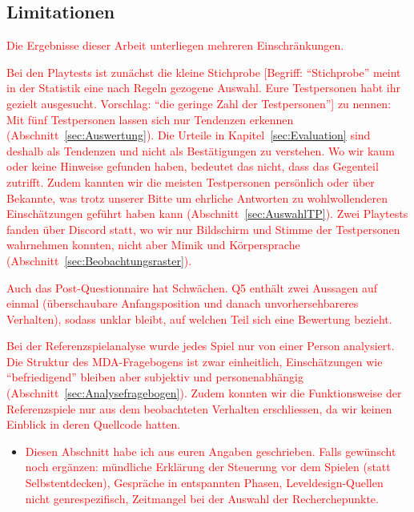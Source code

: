 \documentclass[../Main.tex]{subfiles}
\begin{document}
\subsection{Limitationen} \label{sec:Limitationen}

\textcolor{red}{Die Ergebnisse dieser Arbeit unterliegen mehreren Einschränkungen.}

\textcolor{red}{Bei den Playtests ist zunächst die \textcolor{red}{kleine Stichprobe [Begriff: \enquote{Stichprobe} meint in der Statistik eine nach Regeln gezogene Auswahl. Eure Testpersonen habt ihr gezielt ausgesucht. Vorschlag: \enquote{die geringe Zahl der Testpersonen}]} zu nennen: Mit fünf Testpersonen lassen sich nur Tendenzen erkennen (Abschnitt~\ref{sec:Auswertung}). Die Urteile in Kapitel~\ref{sec:Evaluation} \textcolor{red}{sind deshalb als Tendenzen und nicht als Bestätigungen zu verstehen. Wo wir kaum oder keine Hinweise gefunden haben,} bedeutet das nicht, dass das Gegenteil zutrifft. Zudem kannten wir die meisten Testpersonen persönlich oder über Bekannte, was trotz unserer Bitte um ehrliche Antworten zu wohlwollenderen Einschätzungen geführt haben kann (Abschnitt~\ref{sec:AuswahlTP}). Zwei Playtests fanden über Discord statt, wo wir nur Bildschirm und Stimme der Testpersonen wahrnehmen konnten, nicht aber Mimik und Körpersprache (Abschnitt~\ref{sec:Beobachtungsraster}).}

\textcolor{red}{Auch das Post-Questionnaire hat Schwächen. Q5 enthält zwei Aussagen auf einmal (überschaubare Anfangsposition und danach unvorhersehbareres Verhalten), sodass unklar bleibt, auf welchen Teil sich eine Bewertung bezieht.}

\textcolor{red}{Bei der Referenzspielanalyse wurde jedes Spiel nur von einer Person analysiert. Die Struktur des MDA-Fragebogens ist zwar einheitlich, Einschätzungen wie \enquote{befriedigend} bleiben aber subjektiv und personenabhängig (Abschnitt~\ref{sec:Analysefragebogen}). Zudem konnten wir die Funktionsweise der Referenzspiele nur aus dem beobachteten Verhalten \textcolor{red}{erschliessen}, da wir keinen Einblick in deren Quellcode hatten.}

\begin{itemize}[leftmargin=1.5cm]
    \item \textcolor{red}{Diesen Abschnitt habe ich aus euren Angaben geschrieben. Falls gewünscht noch ergänzen: mündliche Erklärung der Steuerung vor dem Spielen (statt Selbstentdecken), Gespräche in entspannten Phasen, Leveldesign-Quellen nicht genrespezifisch, Zeitmangel bei der Auswahl der Recherchepunkte.}
\end{itemize}
\end{document}
